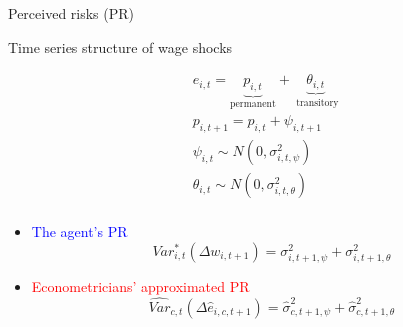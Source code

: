 \documentclass{beamer}
\begin{document}
\begin{frame}{Perceived risks (PR)}
\begin{itemize}
	\end{itemize}	
\end{frame}





\begin{frame}{Time series structure of wage shocks}
	
	\begin{equation*}
		\begin{split}
			& e_{i,t} = \underbrace{p_{i,t}}_{\text{permanent}} + \underbrace{\theta_{i,t}}_{\text{ transitory}} \\
			& p_{i,t+1} = p_{i,t} + \psi_{i,t+1} \\
			& \psi_{i,t} \sim N(0,\sigma^2_{i,t,\psi}) \\
			& \theta_{i,t} \sim N(0,\sigma^2_{i,t,\theta}) \\
		\end{split} 
	\end{equation*}
\pause 
\begin{itemize}
	\item \textcolor{blue}{The agent's PR}
		\begin{equation*}
			Var^*_{i,t}(\Delta w_{i,t+1}) = \sigma^2_{i,t+1,\psi} + \sigma^2_{i,t+1,\theta}		\end{equation*}
\pause 
	\item \textcolor{red}{Econometricians' approximated PR}
\begin{equation*}
		\widehat {Var}_{c,t}(\Delta \hat e_{i,c,t+1})     =  \hat \sigma^2_{c,t+1,\psi} + \hat \sigma^2_{c,t+1,\theta} 
\end{equation*}
	\end{itemize}
\end{frame}
\end{document}
